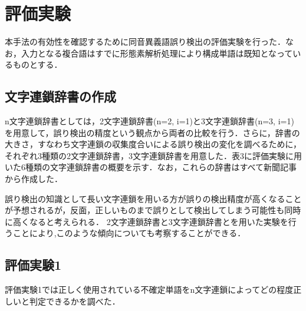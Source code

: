 \begin{figure}[ht]
\begin{center}
\end{center}
\end{figure}


\section{評価実験}
本手法の有効性を確認するために同音異義語誤り検出の評価実験を行った．なお，入力となる複合語はすでに形態素解析処理により構成単語は既知となっているものとする．
\subsection{文字連鎖辞書の作成}
n文字連鎖辞書としては，2文字連鎖辞書(n=2, i=1)と3文字連鎖辞書(n=3, i=1)を用意して，誤り検出の精度という観点から両者の比較を行う．さらに，辞書の大きさ，すなわち文字連鎖の収集度合いによる誤り検出の変化を調べるために，それぞれ3種類の2文字連鎖辞書，3文字連鎖辞書を用意した．表3に評価実験に用いた6種類の文字連鎖辞書の概要を示す．なお，これらの辞書はすべて新聞記事から作成した．

誤り検出の知識として長い文字連鎖を用いる方が誤りの検出精度が高くなることが予想されるが，反面，正しいものまで誤りとして検出してしまう可能性も同時に高くなると考えられる．
2文字連鎖辞書と3文字連鎖辞書とを用いた実験を行うことにより,このような傾向についても考察することができる．

\begin{figure}[h]
\begin{center}
\end{center}
\end{figure}

\vspace*{-5mm}
\subsection{評価実験1}
評価実験1では正しく使用されている不確定単語をn文字連鎖によってどの程度正しいと判定できるかを調べた．
\vspace{-0.2mm}
